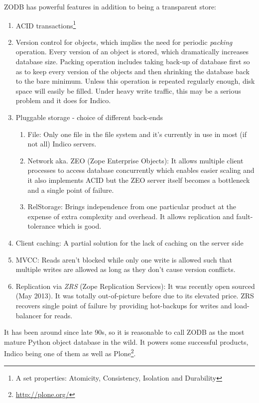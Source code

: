 \textsc{ZODB} has powerful features in addition to being a transparent store:
\begin{enumerate}
  \item ACID transactions\footnote{A set properties: Atomicity, Consistency, Isolation and Durability}
  \item Version control for objects, which implies the need for periodic \textit{packing} operation. Every version of an object is stored, which dramatically increases database size. Packing operation includes taking back-up of database first so as to keep every version of the objects and then shrinking the database back to the bare minimum. Unless this operation is repeated regularly enough, disk space will easily be filled. Under heavy write traffic, this may be a serious problem and it does for Indico.  
  \item Pluggable storage - choice of different back-ends
  \begin{enumerate}
    \item File: Only one file in the file system and it's currently in use in most (if not all) Indico servers.
    \item Network aka. ZEO (Zope Enterprise Objects): It allows multiple client processes to access database concurrently which enables easier scaling and it also implements ACID but the ZEO server itself becomes a bottleneck and a single point of failure.
    \item RelStorage: Brings independence from one particular product at the expense of extra complexity and overhead. It allows replication and fault-tolerance which is good.
  \end{enumerate}
  \item Client caching: A partial solution for the lack of caching on the server side
  \item MVCC: Reads aren't blocked while only one write is allowed such that multiple writes are allowed as long as they don't cause version conflicts.
  \item Replication via \textit{ZRS} (Zope Replication Services): It was recently open sourced (May 2013). It was totally out-of-picture before due to its elevated price. ZRS recovers single point of failure by providing hot-backups for writes and load-balancer for reads.
\end{enumerate}

It has been around since late 90s, so it is reasonable to call \textsc{ZODB} as the most mature Python object database in the wild. It powers some successful products, Indico being one of them as well as Plone\footnote{\url{http://plone.org/}}.

